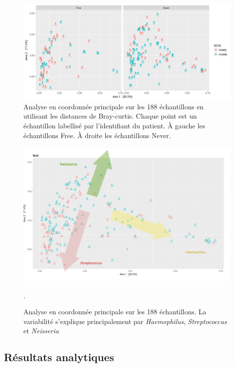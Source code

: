 \documentclass[12pt,a4paper]{article}
\begin{document}
\begin{figure}
\begin{center}
\includegraphics[scale=0.60]{img/oordination_new.png}\hfill
\end{center}
\caption{Analyse en coordonnée principale sur les 188 échantillons en utilisant les distances de Bray-curtis. Chaque point est un échantillon labellisé par l'identifiant du patient. À gauche les échantillons Free. À droite les échantillons Never. }
\label{ordination}
\end{figure}

\begin{figure}
\begin{center}
\includegraphics[scale=0.40]{img/Capture.png}\hfill
\end{center}
\caption{Analyse en coordonnée principale sur les 188 échantillons. La variabilité s'explique principalement par \textit{Haemophilus}, \textit{Streptococcus} et \textit{Neisseria}}.
\label{ordination2}
\end{figure}


\subsection{Résultats analytiques}
\end{document}
